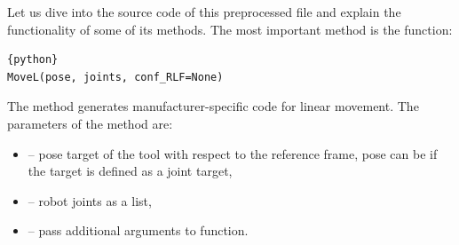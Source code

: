 

Let us dive into the source code of this preprocessed file and explain the functionality of some of its methods. The most important method is the  function:

\begin{lstlisting}[frame=lines,numbers=none,breaklines=true]{python}
MoveL(pose, joints, conf_RLF=None)
\end{lstlisting}
The  method generates manufacturer-specific code for linear movement. 
The parameters of the  method are:

\begin{itemize}

\item {} -- pose target of the tool with respect to the reference frame, pose can be  if the target is defined as a joint target,

\item {} -- robot joints as a list,

\item {} -- pass additional arguments to function. 

\end{itemize}




